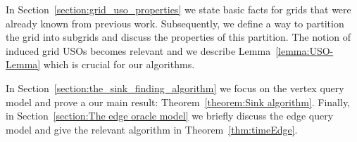 \documentclass[runningheads,a4paper]{llncs}
\newcommand{\AT}[1]{\marginpar{\parbox{3.6cm}{{\small {\bf AT:} #1}}}} %
\begin{document}
In Section~\ref{section:grid_uso_properties} we state basic facts for grids that were already known from previous work. Subsequently, we define a way to partition the grid into subgrids and discuss the properties of this partition. The notion of induced grid USOs becomes relevant and we describe Lemma~\ref{lemma:USO-Lemma} which is crucial for our algorithms.

In Section~\ref{section:the_sink_finding_algorithm} we focus on the vertex query model and prove a our main result: Theorem~\ref{theorem:Sink algorithm}. Finally, in Section~\ref{section:The edge oracle model} we briefly discuss the edge query model and give the relevant algorithm in Theorem~\ref{thm:timeEdge}.







\end{document}
